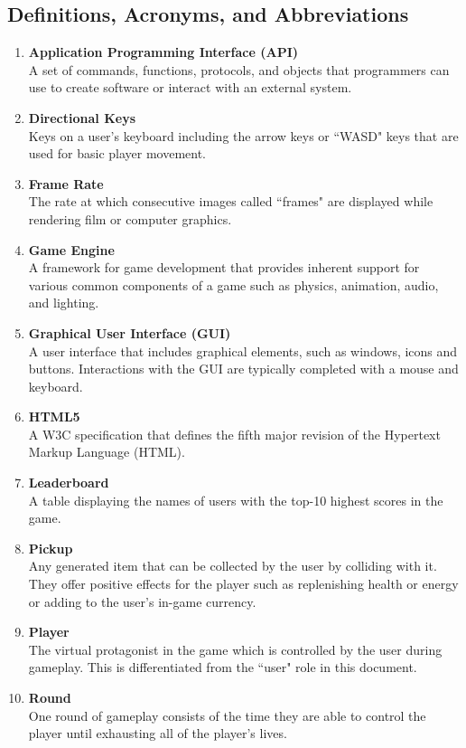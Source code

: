 \documentclass[12pt]{report}
\newenvironment{reqlist}{
	\renewcommand{\labelenumi}{\tab\thesubsection.\arabic{enumi}}
	\renewcommand{\labelenumii}{\thesubsection.\arabic{enumi}.\arabic{enumii}}
	\begin{enumerate}[itemsep = 1pt, parsep = 0pt, leftmargin = *]
}{\end{enumerate}}
\begin{document}
	\subsection{Definitions, Acronyms, and Abbreviations}
		\begin{reqlist}
			\item \textbf{Application Programming Interface (API)} \\ A set of commands, functions, protocols, and objects that programmers can use to create software or interact with an external system.
			\item \textbf{Directional Keys} \\ Keys on a user's keyboard including the arrow keys or ``WASD" keys that are used for basic player movement.
			\item \textbf{Frame Rate} \\ The rate at which consecutive images called ``frames" are displayed while rendering film or computer graphics.
			\item \textbf{Game Engine} \\ A framework for game development that provides inherent support for various common components of a game such as physics, animation, audio, and lighting.
			\item \textbf{Graphical User Interface (GUI)} \\ A user interface that includes graphical elements, such as windows, icons and buttons. Interactions with the GUI are typically completed with a mouse and keyboard.
			\item \textbf{HTML5} \\ A W3C specification that defines the fifth major revision of the Hypertext Markup Language (HTML).
			\item \textbf{Leaderboard} \\ A table displaying the names of users with the top-10 highest scores in the game.
			\item \textbf{Pickup} \\ Any generated item that can be collected by the user by colliding with it. They offer positive effects for the player such as replenishing health or energy or adding to the user's in-game currency.
			\item \textbf{Player} \\ The virtual protagonist in the game which is controlled by the user during gameplay. This is differentiated from the ``user" role in this document.
			\item \textbf{Round} \\ One round of gameplay consists of the time they are able to control the player until exhausting all of the player's lives.

\end{reqlist}
\end{document}
